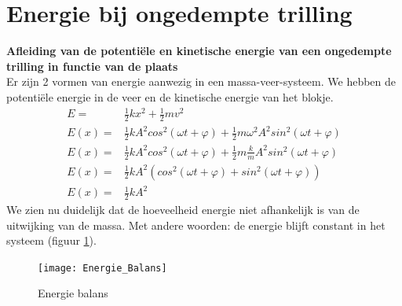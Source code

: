 \documentclass[a4paper,kul]{kulakarticle} %
\begin{document}
\newpage
\section{Energie bij ongedempte trilling}
\textbf{Afleiding van de potentiële en kinetische energie van een ongedempte trilling in functie van de plaats}
\\

Er zijn 2 vormen van energie aanwezig in een massa-veer-systeem. We hebben de potentiële energie in de veer en de kinetische energie van het blokje.
\begin{align*}
	E = & \frac{1}{2}kx^2 + \frac{1}{2}mv^2\\
	E(x) = & \frac{1}{2}k A^2cos^2(\omega t +\varphi) + \frac{1}{2}m \omega^2 A^2 sin^2(\omega t + \varphi)\\
	E(x) = & \frac{1}{2}k A^2cos^2(\omega t +\varphi) + \frac{1}{2}m \frac{k}{m} A^2 sin^2(\omega t + \varphi)\\
	E(x) = & \frac{1}{2} k A^2 (cos^2(\omega t +\varphi) + sin^2(\omega t + \varphi))\\
	E(x) = & \frac{1}{2} k A^2
\end{align*} 
We zien nu duidelijk dat de hoeveelheid energie niet afhankelijk is van de uitwijking van de massa. Met andere woorden: de energie blijft constant in het systeem (figuur \ref{fig:energiebalans}).
\begin{figure}[htbp]
	\centering
	\texttt{[image: Energie\_Balans]}
	\caption[Energie balans]{Energie balans}
	\label{fig:energiebalans}
\end{figure}

\newpage
\end{document}
